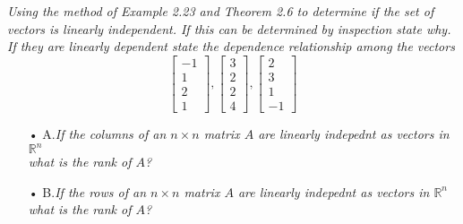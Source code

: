 \documentclass[12pt,letterpaper]{hmcpset}
\begin{document}
\begin{solution}

\end{solution}

\newpage

\begin{problem}[2.3.28]
\textit{Using the method of Example 2.23 and Theorem 2.6 to determine if the set of vectors is linearly independent. If this can be determined by inspection state why. If they are linearly dependent state the dependence relationship among the vectors}
$$\begin{bmatrix}
-1\\1\\2\\1
\end{bmatrix} \phantom{	},
\begin{bmatrix}
3\\2\\2\\4
\end{bmatrix} \phantom{	},
\begin{bmatrix}
2\\3\\1\\-1
\end{bmatrix} \phantom{	}
$$
\end{problem}

\begin{solution}

\end{solution}

\newpage

\begin{problem}[2.3.42]
\begin{enumerate}
\item[•]
A.\textit{If the columns of an $n\times n$ matrix $A$ are linearly indepednt as vectors in $\mathbb{R}^n$\\ \indent \phantom{phantom} what is the rank of $A$?}
\item[•]
\indent B.\textit{If the rows of an $n\times n$ matrix $A$ are linearly indepednt as vectors in $\mathbb{R}^n$\\ \indent \phantom{phantom} what is the rank of $A$?}
\end{enumerate}
\end{problem}


\begin{solution}

\end{solution}
\end{document}
